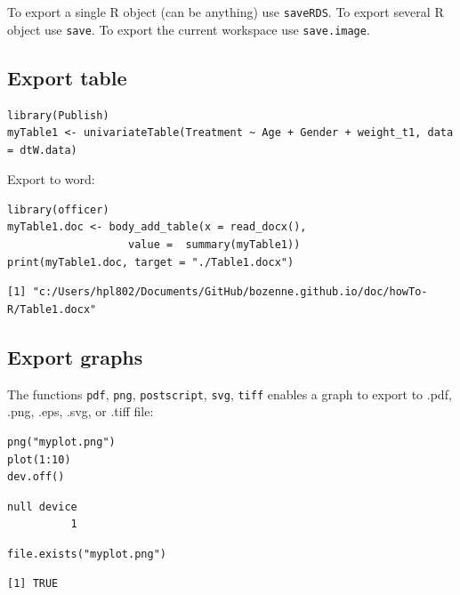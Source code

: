 \documentclass{article}
\begin{document}
To export a single R object (can be anything) use \texttt{saveRDS}.
To export several R object use \texttt{save}.
To export the current workspace use \texttt{save.image}.

\subsection{Export table}
\label{sec:orge6ae608}

\lstset{language=r,label= ,caption= ,captionpos=b,numbers=none}
\begin{lstlisting}
library(Publish)
myTable1 <- univariateTable(Treatment ~ Age + Gender + weight_t1, data = dtW.data)
\end{lstlisting}

Export to word:
\lstset{language=r,label= ,caption= ,captionpos=b,numbers=none}
\begin{lstlisting}
library(officer)
myTable1.doc <- body_add_table(x = read_docx(), 
			       value =  summary(myTable1)) 
print(myTable1.doc, target = "./Table1.docx")
\end{lstlisting}

\begin{verbatim}
[1] "c:/Users/hpl802/Documents/GitHub/bozenne.github.io/doc/howTo-R/Table1.docx"
\end{verbatim}

\subsection{Export graphs}
\label{sec:org6b33555}

The functions \texttt{pdf}, \texttt{png}, \texttt{postscript}, \texttt{svg}, \texttt{tiff} enables a graph to
export to .pdf, .png, .eps, .svg, or .tiff file:
\lstset{language=r,label= ,caption= ,captionpos=b,numbers=none}
\begin{lstlisting}
png("myplot.png")
plot(1:10)
dev.off()
\end{lstlisting}

\begin{verbatim}
null device 
          1
\end{verbatim}

\lstset{language=r,label= ,caption= ,captionpos=b,numbers=none}
\begin{lstlisting}
file.exists("myplot.png")
\end{lstlisting}

\begin{verbatim}
[1] TRUE
\end{verbatim}
\end{document}
